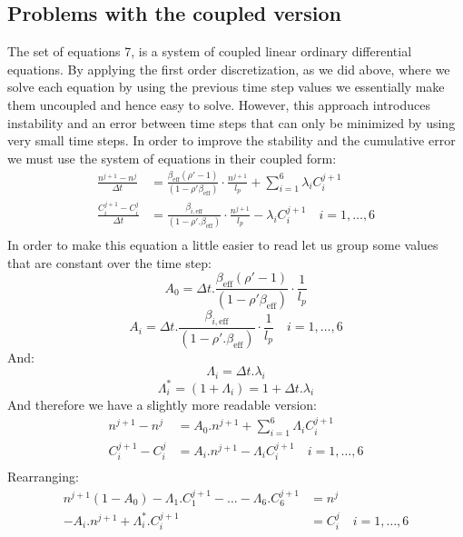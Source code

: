 \documentclass[11pt,letterpaper,titlepage]{article}
\begin{document}
\subsection{Problems with the coupled version}
The set of equations 7, is a system of coupled linear ordinary differential equations. By applying the first order discretization, as we did above, where we solve each equation by using the previous time step values we essentially make them uncoupled and hence easy to solve. However, this approach introduces instability and an error between time steps that can only be minimized by using very small time steps. In order to improve the stability and the cumulative error we must use the system of equations in their coupled form:
\begin{equation*}
\begin{aligned}
\frac{n^{j+1}-n^j}{\Delta t}&= \frac{\beta_{\mathrm{eff}}(\rho'-1)}{(1-\rho'\beta_{\mathrm{eff}})}\cdot \frac{n^{j+1}}{l_p}  + \sum_{i=1}^6 \lambda_i C_i^{j+1} \\
\frac{C_i^{j+1}-C_i^j}{\Delta t} &= \frac{\beta_{i,\mathrm{eff}}}{(1-\rho'.\beta_{\mathrm{eff}})}  \cdot   \frac{n^{j+1}}{l_p}  - \lambda_i C_i^{j+1} \quad i=1,\dots,6 \\
\end{aligned}
\end{equation*}
\newline
\noindent
In order to make this equation a little easier to read let us group some values that are constant over the time step:
$$
A_0=\Delta t.\frac{\beta_{\mathrm{eff}}(\rho'-1)}{(1-\rho'\beta_{\mathrm{eff}})}\cdot \frac{1}{l_p}
$$
$$
A_i=\Delta t.\frac{\beta_{i,\mathrm{eff}}}{(1-\rho'.\beta_{\mathrm{eff}})}  \cdot   \frac{1}{l_p} \quad i=1,\dots,6 
$$
And:
$$
\Lambda_i = \Delta t.\lambda_i
$$
$$
\Lambda_i^*=(1+\Lambda_i)= 1+\Delta t.\lambda_i
$$
And therefore we have a slightly more readable version:
\begin{equation*}
\begin{aligned}
n^{j+1}-n^j&= A_0.n^{j+1}  + \sum_{i=1}^6 \Lambda_i C_i^{j+1} \\
C_i^{j+1}-C_i^j &= A_i.n^{j+1} - \Lambda_i C_i^{j+1} \quad i=1,\dots,6 \\
\end{aligned}
\end{equation*}
\newline
\noindent
Rearranging:
\begin{equation*}
\begin{aligned}
n^{j+1}(1-A_0) - \Lambda_1.C_1^{j+1}- \dots - \Lambda_6.C_6^{j+1}&=n^{j} \\
-A_i.n^{j+1} + \Lambda_i^* .C_i^{j+1} &=   C_i^j\quad i=1,\dots,6 \\
\end{aligned}
\end{equation*}
\end{document}
